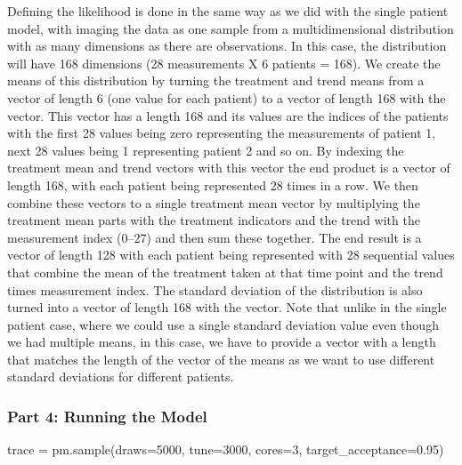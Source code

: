 \documentclass[12pt,a4paper,leqno]{report}
\theoremstyle{plain}
\theoremstyle{definition}
\theoremstyle{remark}
\begin{document}
Defining the likelihood is done in the same way as we did with the single patient model,
with imaging the data as one sample from a multidimensional distribution with as many
dimensions as there are observations. In this case, the
distribution will have 168 dimensions (28 measurements X 6 patients = 168). We
create the means of this distribution by turning the treatment and trend means from
a vector of length 6 (one value for each patient) to a vector of length 168 with the
 vector. This vector has a length 168 and its values are the indices of the
patients with the first 28 values being
zero representing the measurements of patient 1, next 28 values being 1 representing
patient 2 and so on. By indexing the treatment mean and trend vectors with this vector the end
product is a vector of length 168, with each patient being represented 28 times
in a row. We then combine these vectors to a single treatment mean vector by multiplying
the treatment mean parts with the treatment indicators and the trend with the
measurement index (0--27) and then sum these together. The end result is a
vector of length 128 with each patient being represented with 28 sequential values that
combine the mean of the treatment taken at that time point and the trend times measurement index. The standard
deviation of the distribution is also turned into a vector of length 168 with the
 vector. Note that unlike in the single patient case, where we could use a single
standard deviation value even though we had multiple means, in this case, we have to
provide a vector with a length that matches the length of the vector of the means as we
want to use different standard deviations for different patients.

\subsubsection*{Part 4: Running the Model}

\bigskip
\begin{pyverbatim}[][fontsize=\footnotesize]
    trace = pm.sample(draws=5000, tune=3000, cores=3, target_acceptance=0.95)
\end{pyverbatim}
\bigskip
\end{document}
